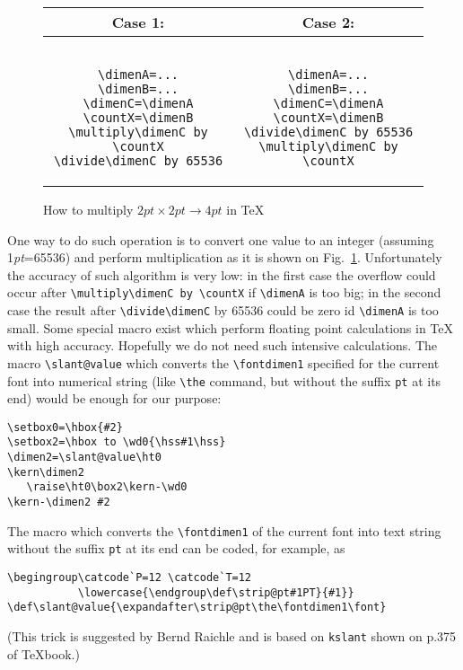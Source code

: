 \begin{figure}
\begin{center}
\begin{tabular}{|c|c|}
\hline
Case 1: & Case 2: \\
\hline
\begin{minipage}{0.45\hsize}
\begin{verbatim}

\dimenA=...
\dimenB=...
\dimenC=\dimenA
\countX=\dimenB
\multiply\dimenC by \countX
\divide\dimenC by 65536

\end{verbatim}
\end{minipage}
&
\begin{minipage}{0.45\hsize}
\begin{verbatim}

\dimenA=...
\dimenB=...
\dimenC=\dimenA
\countX=\dimenB
\divide\dimenC by 65536
\multiply\dimenC by \countX

\end{verbatim}
\end{minipage}
\\
\hline
\end{tabular}
\end{center}
\caption{How to multiply $ 2pt\times2pt\to4pt$ in \TeX\label{S-Fig1}}
\end{figure}

One way to do such operation is to convert one value to
an integer (assuming 1{\em pt}=65536) and perform multiplication
as it is shown on Fig.~\ref{S-Fig1}. Unfortunately the accuracy of such
algorithm is very low: in the first case the overflow could
occur after \verb?\multiply\dimenC by \countX? if \verb?\dimenA?
is too big; in the second case the result after
\verb?\divide\dimenC? by 65536 could be zero id \verb?\dimenA?
is too small. Some special macro exist \cite{DRATEX,Calc,FP,Real}
which perform floating point calculations in \TeX{}
with high accuracy. Hopefully we do not need such intensive
calculations. The macro \verb?\slant@value?
which converts the \verb?\fontdimen1? specified for the current font
into numerical string (like \verb?\the? command, but without the
suffix {\tt pt} at its end) would be enough for our purpose:
\begin{verbatim}
\setbox0=\hbox{#2}
\setbox2=\hbox to \wd0{\hss#1\hss}
\dimen2=\slant@value\ht0
\kern\dimen2
   \raise\ht0\box2\kern-\wd0
\kern-\dimen2 #2
\end{verbatim}
The macro which converts the \verb?\fontdimen1? of the current font
into text string without the suffix {\tt pt} at its end
can be coded, for example, as
\begin{verbatim}
\begingroup\catcode`P=12 \catcode`T=12
           \lowercase{\endgroup\def\strip@pt#1PT}{#1}}
\def\slant@value{\expandafter\strip@pt\the\fontdimen1\font}
\end{verbatim}
(This trick is suggested by Bernd Raichle and is based
on {\tt\bs{}kslant} shown on p.375 of \TeX{}book.)

